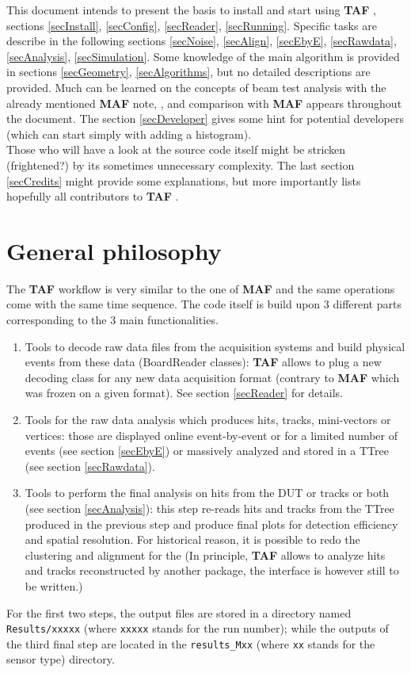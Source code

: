 \documentclass[a4paper, 12pt, twoside]{article}
\newcommand{\TAF}{{\bf TAF }}
\newcommand{\MAF}{{\bf MAF }}
\begin{document}
\noindent
This document intends to present the basis to install and start using \TAF, sections \ref{secInstall}, \ref{secConfig}, \ref{secReader}, \ref{secRunning}. Specific tasks are describe in the following sections \ref{secNoise}, \ref{secAlign}, \ref{secEbyE}, \ref{secRawdata}, \ref{secAnalysis}, \ref{secSimulation}. Some knowledge of the main algorithm is provided in sections \ref{secGeometry}, \ref{secAlgorithms}, but no detailed descriptions are provided. Much can be learned on the concepts of beam test analysis with the already mentioned \MAF note, \cite{noteMAF}, and comparison with \MAF appears throughout the document. The section \ref{secDeveloper} gives some hint for potential developers (which can start simply with adding a histogram).\\
Those who will have a look at the source code itself might be stricken (frightened?) by its sometimes unnecessary complexity. The last section \ref{secCredits} might provide some explanations, but more importantly lists hopefully all contributors to \TAF.


\vspace{2cm}

\section{General philosophy}

The \TAF  workflow is very similar to the one of \MAF  and the same operations come with the same time sequence. The code itself is build upon 3 different parts corresponding to the 3 main functionalities.
\begin{enumerate}
\item Tools to decode raw data files from the acquisition systems and build physical events from these data (BoardReader classes): \TAF  allows to plug a new decoding class for any new data acquisition format (contrary to \MAF  which was frozen on a given format). See section \ref{secReader} for details.
\item Tools for the raw data analysis which produces hits, tracks, mini-vectors or vertices: those are displayed online event-by-event or for a limited number of events (see section \ref{secEbyE}) or massively analyzed and stored in a TTree (see section \ref{secRawdata}).
\item Tools to perform the final analysis on hits from the DUT or tracks or both (see section \ref{secAnalysis}): this step re-reads hits and tracks from the TTree produced in the previous step and produce final plots for detection efficiency and spatial resolution. For historical reason, it is possible to redo the clustering and alignment for the (In principle, \TAF  allows to analyze hits and tracks reconstructed by another package, the interface is however still to be written.)
\end{enumerate}
For the first two steps, the output files are stored in a directory named {\tt Results/xxxxx} (where {\tt xxxxx} stands for the run number); while the outputs of the third final step are located in the {\tt results\_Mxx} (where {\tt xx} stands for the sensor type) directory.
\end{document}

